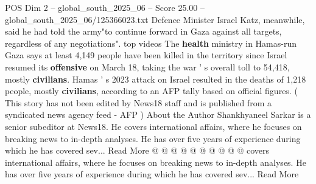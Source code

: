 \begin{textsample}{POS Dim 2 – global\_south\_2025\_06 – Score 25.00 – global\_south\_2025\_06/125366023.txt}
Defence Minister Israel Katz, meanwhile, said he had told the army"to continue forward in Gaza against all targets, regardless of any negotiations". top videos The \textbf{health} ministry in Hamas-run Gaza says at least 4,149 people have been killed in the territory since Israel resumed its \textbf{offensive} on March 18, taking the war ' s overall toll to 54,418, mostly \textbf{civilians}.
Hamas ' s 2023 attack on Israel resulted in the deaths of 1,218 people, mostly \textbf{civilians}, according to an AFP tally based on official figures. ( This story has not been edited by News18 staff and is published from a syndicated news agency feed - AFP ) About the Author Shankhyaneel Sarkar is a senior subeditor at News18.
He covers international affairs, where he focuses on breaking news to in-depth analyses.
He has over five years of experience during which he has covered sev...
Read More @ @ @ @ @ @ @ @ @ @ covers international affairs, where he focuses on breaking news to in-depth analyses.
He has over five years of experience during which he has covered sev...
Read More

\end{textsample}
